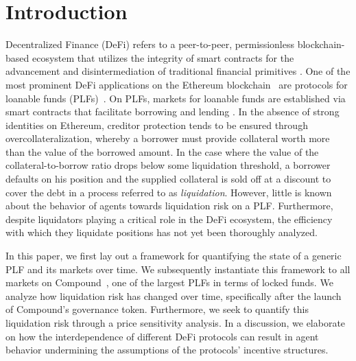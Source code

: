 \section{Introduction}
\label{sec:introduction}

Decentralized Finance (DeFi) refers to a peer-to-peer, permissionless blockchain-based ecosystem that utilizes the integrity of smart contracts for the advancement and disintermediation of traditional financial primitives \cite{Werner2021}. 
One of the most prominent DeFi applications on the Ethereum blockchain~\cite{wood2014ethereum} are protocols for loanable funds (PLFs)~\cite{gudgeon2020defi}.
On PLFs, markets for loanable funds are established via smart contracts that facilitate borrowing and lending \cite{Xu2021FromMarket}.
In the absence of strong identities on Ethereum, creditor protection tends to be ensured through overcollateralization, whereby a borrower must provide collateral worth more than the value of the borrowed amount.
In the case where the value of the collateral-to-borrow ratio drops below some liquidation threshold, a borrower defaults on his position and the supplied collateral is sold off at a discount to cover the debt in a process referred to as \textit{liquidation}.
However, little is known about the behavior of agents towards liquidation risk on a PLF.
Furthermore, despite liquidators playing a critical role in the DeFi ecosystem, the efficiency with which they liquidate positions has not yet been thoroughly analyzed.

In this paper, we first lay out a framework for quantifying the state of a generic PLF and its markets over time. 
We subsequently instantiate this framework to all markets on Compound~\cite{Leshner2018}, one of the largest PLFs in terms of locked funds.
We analyze how liquidation risk has changed over time, specifically after the launch of Compound's governance token.
Furthermore, we seek to quantify this liquidation risk through a price sensitivity analysis.
In a discussion, we elaborate on how the interdependence of different DeFi protocols can result in agent behavior undermining the assumptions of the protocols' incentive structures.

